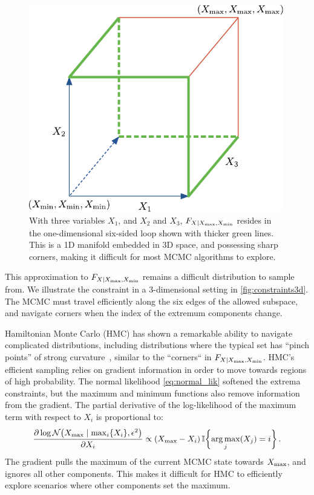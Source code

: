 \documentclass[12pt]{article}
\begin{document}
\begin{figure}[tbp]
\centering
\includegraphics[height=0.3\textheight,width=0.99\textwidth,keepaspectratio]{../figures/constraints3d.pdf}
\caption{\label{fig:constraints3d}
With three variables \(X_1\), and \(X_2\) and \(X_3\), \(F_{X \mid X_{\max},X_{\min}}\) resides in the one-dimensional six-sided loop shown with thicker green lines. This is a 1D manifold embedded in 3D space, and possessing sharp corners, making it difficult for most MCMC algorithms to explore.}
\end{figure}

This approximation to \(F_{X \mid X_{\max},X_{\min}}\) remains a difficult distribution to sample from.
We illustrate the constraint in a 3-dimensional setting in \autoref{fig:constraints3d}.
The MCMC must travel efficiently along the six edges of the allowed subspace,
and navigate corners when the index of the extremum components change.

Hamiltonian Monte Carlo (HMC) has shown a remarkable ability to navigate complicated distributions, including distributions where the typical set has ``pinch points'' of strong
curvature~\citep{betancourt2017conceptual}, similar to the ``corners`` in \(F_{X \mid X_{\max},X_{\min}}\).
HMC's efficient sampling relies on gradient information in order to move towards regions of high probability.
The normal likelihood \autoref{eq:normal_lik} softened the extrema constraints,
but the maximum and minimum functions also remove information from the gradient.
The partial derivative of the log-likelihood of the maximum term with respect to \(X_i\) is proportional to:
\begin{equation}
\frac{\partial \log \normal\del{\Xmax \mid \max_i\cbr{X_i}, \epsilon^2}}{\partial X_i} \propto \del{\Xmax - X_i} \Ind\cbr{\argmax_j\del{X_j} = i} \,.
\end{equation}
The gradient pulls the maximum of the current MCMC state towards \(X_{\max}\),
and ignores all other components.
This makes it difficult for HMC to efficiently explore scenarios where other components set the maximum.
\end{document}
